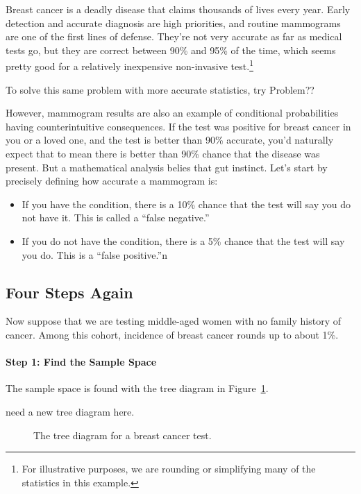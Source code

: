 Breast cancer is a deadly disease that claims thousands of lives every
year.  Early detection and accurate diagnosis are high priorities, and
routine mammograms are one of the first lines of defense.  They're not
very accurate as far as medical tests go, but they are correct between
90\% and 95\% of the time, which seems pretty good for a relatively
inexpensive non-invasive test.\footnote{For illustrative purposes, we
  are rounding or simplifying many of the statistics in this example.}
\begin{editingnotes}
  To solve this same problem
  with more accurate statistics, try Problem??
\end{editingnotes}
However, mammogram results are also an example of conditional
probabilities having counterintuitive consequences.  If the test was
positive for breast cancer in you or a loved one, and the test is
better than 90\% accurate, you'd naturally expect that to mean there
is better than 90\% chance that the disease was present. But a
mathematical analysis belies that gut instinct.  Let's start by
precisely defining how accurate a mammogram is:
\begin{itemize}

\item If you have the condition, there is a 10\% chance that the test
  will say you do not have it.  This is called a ``false negative.''

\item If you do not have the condition, there is a 5\% chance that the
  test will say you do.  This is a ``false positive.''n

\end{itemize}

\subsection{Four Steps Again}

Now suppose that we are testing middle-aged women with no family
history of cancer.  Among this cohort, incidence of breast cancer
rounds up to about 1\%.

\paragraph{Step 1: Find the Sample Space}

The sample space is found with the tree diagram in
Figure~\ref{fig:15C1}.
\begin{editingnotes}
need a new tree diagram here.
\end{editingnotes}
\begin{figure}[h]


\caption{The tree diagram for a breast cancer test.}

\label{fig:15C1}

\end{figure}

